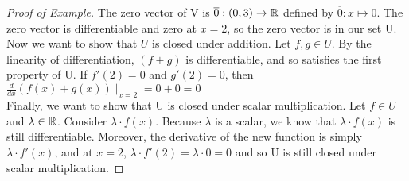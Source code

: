 \documentclass{memoir}
\begin{document}
\begin{proof}[Proof of Example]
The zero vector of V is $\overline{0}:(0,3)\to \mathbb{R}$ defined by $\overline{0}:x\mapsto  0$. The zero vector is differentiable and zero at $x=2$, so the zero vector is in our set U.\\

Now we want to show that $U$ is closed under addition. Let $f,g \in U$. By the linearity of differentiation, $(f+g)$ is differentiable, and so satisfies the first property of U. If $f'(2)=0$ and $g'(2)=0$, then $\frac{d}{dx}(f(x)+g(x))\mid_{x=2} = 0 + 0 = 0$\\

Finally, we want to show that U is closed under scalar multiplication. Let $f\in U$ and $\lambda \in \mathbb{R}$. Consider $\lambda \cdot f(x)$. Because $\lambda$ is a scalar, we know that $\lambda \cdot f(x)$ is still differentiable. Moreover, the derivative of the new function is simply $\lambda \cdot f'(x)$, and at $x = 2$, $\lambda \cdot f'(2) = \lambda \cdot 0 = 0$ and so U is still closed under scalar multiplication.
\end{proof}

\end{document}
